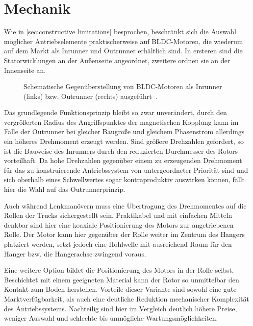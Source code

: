\chapter{Mechanik}
	Wie in \cref{sec:constructive limitations} besprochen, beschränkt sich die Auswahl möglicher Antriebselemente praktischerweise auf BLDC-Motoren, die wiederum auf dem Markt als Inrunner und Outrunner erhältlich sind.
	In ersteren sind die Statorwicklungen an der Außenseite angeordnet, zweitere ordnen sie an der Innenseite an.
	\begin{figure}[h]
		\centering
		
		\caption[Gegenüberstellung von Inrunner und Outrunner]{Schematische Gegenüberstellung von BLDC-Motoren als Inrunner (links) bzw. Outrunner (rechts) ausgeführt~\cite{inrunner.outrunner.2022}.}%
		\label{fig:inrunner outrunner}
	\end{figure}
	Das grundlegende Funktionsprinzip bleibt so zwar unverändert, durch den vergrößerten Radius des Angriffspunktes der magnetischen Kopplung kann im Falle der Outrunner bei gleicher Baugröße und gleichem Phasenstrom allerdings ein höheres Drehmoment erzeugt werden.
	Sind größere Drehzahlen gefordert, so ist die Bauweise des Inrunners durch den reduzierten Durchmesser des Rotors vorteilhaft.
	Da hohe Drehzahlen gegenüber einem zu erzeugenden Drehmoment für das zu konstruierende Antriebssystem von untergeordneter Priorität sind und sich oberhalb eines Schwellwertes sogar kontraproduktiv auswirken können, fällt hier die Wahl auf das Outrunnerprinzip.\par\medskip
	Auch während Lenkmanövern muss eine Übertragung des Drehmomentes auf die Rollen der Trucks sichergestellt sein.
	Praktikabel und mit einfachen Mitteln denkbar sind hier eine koaxiale Positionierung des Motors zur angetriebenen Rolle.
	Der Motor kann hier gegenüber der Rolle weiter im Zentrum des Hangers platziert werden, setzt jedoch eine Hohlwelle mit ausreichend Raum für den Hanger bzw. die Hangerachse zwingend voraus.

	Eine weitere Option bildet die Positionierung des Motors in der Rolle selbst.
	Beschichtet mit einem geeigneten Material kann der Rotor so unmittelbar den Kontakt zum Boden herstellen.
	Vorteile dieser Variante sind sowohl eine gute Marktverfügbarkeit, als auch eine deutliche Reduktion mechanischer Komplexität des Antriebssystems.
	Nachteilig sind hier im Vergleich deutlich höhere Preise, weniger Auswahl und schlechte bis unmögliche Wartungsmöglichkeiten.

